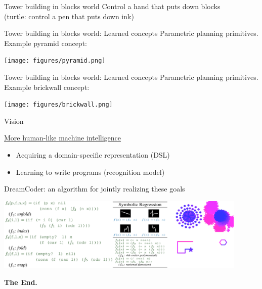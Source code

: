 \documentclass{beamer}
\begin{document}
\begin{frame}{Tower building in blocks world}
  \large
\centering  
  Control a hand that puts down blocks \\
  \hspace{1cm}(turtle: control a pen that puts down ink)
  

  \end{frame}

\begin{frame}{Tower building in blocks world: Learned concepts}
  Parametric planning primitives. Example pyramid concept:

  \texttt{[image: figures/pyramid.png]}

\end{frame}

\begin{frame}{Tower building in blocks world: Learned concepts}
  Parametric planning primitives. Example brickwall concept:

  \texttt{[image: figures/brickwall.png]} 

  \end{frame}

\begin{frame}{Vision}


   \underline{More human-like machine intelligence}\\%
   \begin{itemize}
   \item    Acquiring a domain-specific representation (DSL)
     \item Learning  to write programs (recognition model)
   \end{itemize}
   DreamCoder: an algorithm for jointly realizing these goals

   



   \hspace{-1cm}\includegraphics[width = 12cm]{figures/finale.png}

   \pause

   \Huge \centering \textbf{The End.}
  \end{frame}
\end{document}
